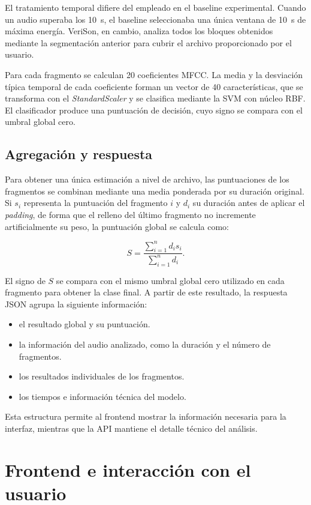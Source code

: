 El tratamiento temporal difiere del empleado en el baseline experimental. Cuando un audio superaba los 10~s, el baseline seleccionaba una única ventana de 10~s de máxima energía. VeriSon, en cambio, analiza todos los bloques obtenidos mediante la segmentación anterior para cubrir el archivo proporcionado por el usuario.

Para cada fragmento se calculan 20 coeficientes MFCC. La media y la desviación típica temporal de cada coeficiente forman un vector de 40 características, que se transforma con el \textit{StandardScaler} y se clasifica mediante la SVM con núcleo RBF. El clasificador produce una puntuación de decisión, cuyo signo se compara con el umbral global cero.

\subsection{Agregación y respuesta}

Para obtener una única estimación a nivel de archivo, las puntuaciones de los fragmentos se combinan mediante una media ponderada por su duración original. Si $s_i$ representa la puntuación del fragmento $i$ y $d_i$ su duración antes de aplicar el \textit{padding}, de forma que el relleno del último fragmento no incremente artificialmente su peso, la puntuación global se calcula como:

\[
    S = \frac{\sum_{i=1}^{n} d_i s_i}{\sum_{i=1}^{n} d_i}.
\]

El signo de $S$ se compara con el mismo umbral global cero utilizado en cada fragmento para obtener la clase final. A partir de este resultado, la respuesta JSON agrupa la siguiente información:

\begin{itemize}
    \item el resultado global y su puntuación.
    \item la información del audio analizado, como la duración y el número de fragmentos.
    \item los resultados individuales de los fragmentos.
    \item los tiempos e información técnica del modelo.
\end{itemize}

Esta estructura permite al frontend mostrar la información necesaria para la interfaz, mientras que la API mantiene el detalle técnico del análisis.

\section{Frontend e interacción con el usuario}

